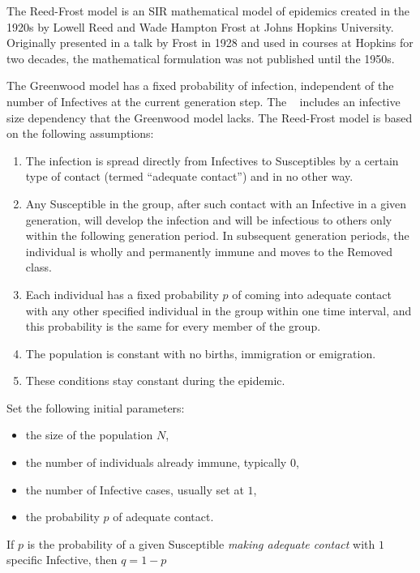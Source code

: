 \documentclass[12pt]{article}
\begin{document}
The Reed-Frost model is an SIR mathematical model of epidemics created
in the 1920s by Lowell Reed and Wade Hampton Frost at Johns Hopkins
University.  Originally presented in a talk by Frost in 1928 and used in
courses at Hopkins for two decades, the mathematical formulation was not
published until the 1950s.

The Greenwood model has a fixed probability of infection, independent of
the number of Infectives at the current generation step.  The ~%
includes an infective size dependency that the Greenwood model lacks.
The Reed-Frost model is based on the following assumptions:
\begin{enumerate}
    \item
        The infection is spread directly from Infectives to Susceptibles
        by a certain type of contact (termed ``adequate contact'') and
        in no other way.
    \item
        Any Susceptible in the group, after such contact with an
        Infective in a given generation, will develop the infection and
        will be infectious to others only within the following
        generation period.  In subsequent generation periods, the
        individual is wholly and permanently immune and moves to the
        Removed class.
    \item
        Each individual has a fixed probability \( p \) of coming into
        adequate contact with any other specified individual in the
        group within one time interval, and this probability is the same
        for every member of the group.
    \item
        The population is constant with no births, immigration or
        emigration.
    \item
        These conditions stay constant during the epidemic.
\end{enumerate}
Set the following initial parameters:
\begin{itemize}
    \item
        the size of the population \( N \),
    \item
        the number of individuals already immune, typically \( 0 \),
    \item
        the number of Infective cases, usually set at \( 1 \),
    \item
        the probability \( p \) of adequate contact.
\end{itemize}
If \( p \) is the probability of a given Susceptible \emph{making
adequate contact} with \( 1 \) specific Infective, then \( q = 1 - p \)
\end{document}
